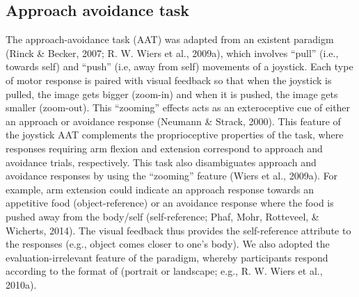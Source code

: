 \documentclass[man,floatsintext]{apa6}
\begin{document}
\hypertarget{aat}{%
\subsection{Approach avoidance task}\label{aat}}

\par

The approach-avoidance task (AAT) was adapted from an existent paradigm (Rinck \& Becker, 2007; R. W. Wiers et al., 2009a), which involves \enquote{pull} (i.e., towards self) and \enquote{push} (i.e, away from self) movements of a joystick. Each type of motor response is paired with visual feedback so that when the joystick is pulled, the image gets bigger (zoom-in) and when it is pushed, the image gets smaller (zoom-out). This \enquote{zooming} effects acts as an exteroceptive cue of either an approach or avoidance response (Neumann \& Strack, 2000). This feature of the joystick AAT complements the proprioceptive properties of the task, where responses requiring arm flexion and extension correspond to approach and avoidance trials, respectively. This task also disambiguates approach and avoidance responses by using the \enquote{zooming} feature (Wiers et al., 2009a). For example, arm extension could indicate an approach response towards an appetitive food (object-reference) or an avoidance response where the food is pushed away from the body/self (self-reference; Phaf, Mohr, Rotteveel, \& Wicherts, 2014). The visual feedback thus provides the self-reference attribute to the responses (e.g., object comes closer to one's body). We also adopted the evaluation-irrelevant feature of the paradigm, whereby participants respond according to the format of (portrait or landscape; e.g., R. W. Wiers et al., 2010a).

\par
\end{document}
